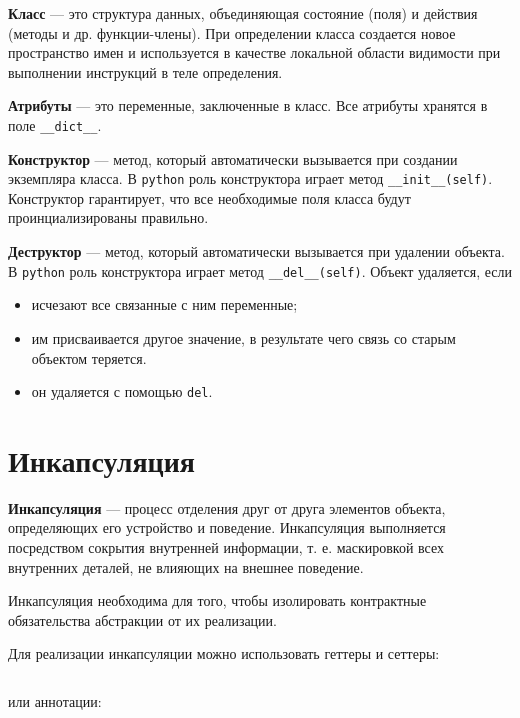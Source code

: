 \documentclass[a4paper,12pt,oneside]{extbook}
\begin{document}
\textbf{Класс} — это структура данных, объединяющая состояние (поля) и действия (методы и др. функции-члены). При определении класса создается новое пространство имен и используется в качестве локальной области видимости при выполнении инструкций в теле определения.

\textbf{Атрибуты} — это переменные, заключенные в класс. Все атрибуты хранятся в поле \texttt{\_\_dict\_\_}.

\textbf{Конструктор} — метод, который автоматически вызывается при создании экземпляра класса. В \texttt{python} роль конструктора играет метод \texttt{\_\_init\_\_(self)}. Конструктор гарантирует, что все необходимые поля класса будут проинциализированы правильно.

\textbf{Деструктор} — метод, который автоматически вызывается при удалении объекта. В \texttt{python} роль конструктора играет метод \texttt{\_\_del\_\_(self)}. Объект удаляется, если
\begin{itemize}
    \item исчезают все связанные с ним переменные;
    \item им присваивается другое значение, в результате чего связь со старым объектом теряется.
    \item он удаляется с помощью \texttt{del}.
\end{itemize}

\section{Инкапсуляция}%
\label{sec:Инкапсуляция}

\textbf{Инкапсуляция} — процесс отделения друг от друга элементов объекта, определяющих его устройство и поведение. Инкапсуляция выполняется посредством сокрытия внутренней информации, т. е. маскировкой всех внутренних деталей, не влияющих на внешнее поведение.

Инкапсуляция необходима для того, чтобы изолировать контрактные обязательства абстракции от их реализации.

Для реализации инкапсуляции можно использовать геттеры и сеттеры:
\inputminted{python}{./examples/get_and_set.py}
или аннотации:
\inputminted{python}{./examples/annotations.py}
\end{document}
